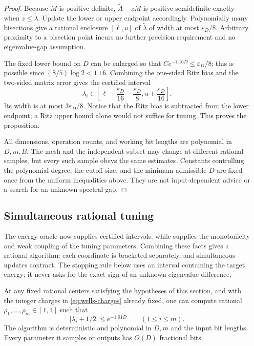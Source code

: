 \begin{proof}
Because \(M\) is positive definite,
\(\widetilde A-zM\) is positive semidefinite exactly when
\(z\le\widetilde\lambda\). Update the lower or upper endpoint
accordingly. Polynomially many bisections give a rational enclosure
\([\ell,u]\) of \(\widetilde\lambda\) of width at most
\(\varepsilon_D/8\). Arbitrary proximity to a bisection point incurs
no further precision requirement and no eigenvalue-gap assumption.

The fixed lower bound on \(D\) can be enlarged so that
\(Ce^{-1.16D}\le\varepsilon_D/8\); this is possible since
\((8/5)\log2<1.16\).
Combining the one-sided Ritz bias and the two-sided matrix error
gives the certified interval
\begin{equation}
 \lambda_i\in
 \left[\ell-\frac{\varepsilon_D}{16}
              -\frac{\varepsilon_D}{8},
       u+\frac{\varepsilon_D}{16}\right].
 \label{eq:wells-certified-enclosure}
\end{equation}
Its width is at most \(3\varepsilon_D/8\).
Notice that the Ritz bias is subtracted from the lower endpoint;
a Ritz upper bound alone would not suffice for tuning.
This proves the proposition.

All dimensions, operation counts, and working bit lengths are
polynomial in \(D,m,B\). The mesh and the independent subset may
change at different rational samples, but every such sample obeys
the same estimates. Constants controlling the polynomial degree,
the cutoff size, and the minimum admissible \(D\) are fixed once
from the uniform inequalities above. They are not input-dependent
advice or a search for an unknown spectral gap.
\end{proof}

\subsection{Simultaneous rational tuning}

The energy oracle now supplies certified intervals, while
 supplies the monotonicity and weak coupling of
the tuning parameters. Combining these facts gives a rational algorithm:
each coordinate is bracketed separately, and simultaneous updates contract.
The stopping rule below uses an interval containing the target energy;
it never asks for the exact sign of an unknown eigenvalue difference.

\begin{proposition}
\label{prop:tuning}
At any fixed rational centers satisfying the hypotheses of this
section, and with the integer charges in \eqref{eq:wells-charges}
already fixed, one can compute rational
\(\rho_1,\ldots,\rho_m\in[1,4]\) such that
\begin{equation}
 |\lambda_i+1/2|\le e^{-1.01D}\qquad(1\le i\le m).
 \label{eq:wells-tuned}
\end{equation}
The algorithm is deterministic and polynomial in \(D,m\) and the
input bit lengths. Every parameter it samples or outputs has
\(O(D)\) fractional bits.
\end{proposition}

